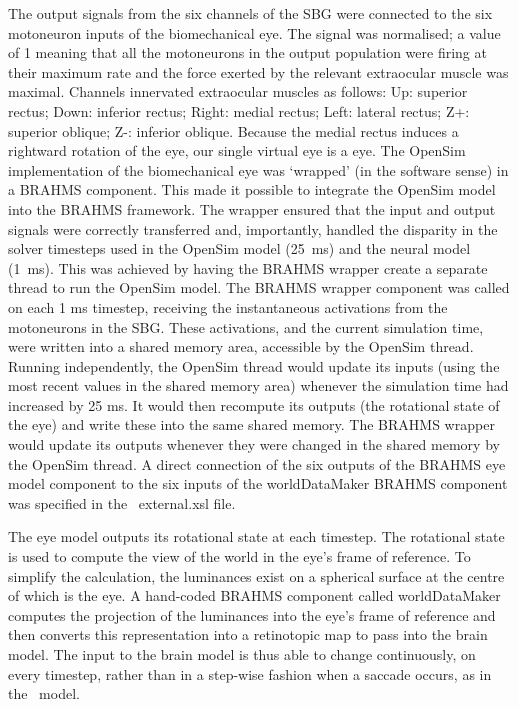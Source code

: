 \documentclass{frontiersSCNS}
\begin{document}
The output signals from the six channels of the SBG were connected to
the six motoneuron inputs of the biomechanical eye. The signal was
normalised; a value of 1 meaning that all the motoneurons in the
output population were firing at their maximum rate and the force
exerted by the relevant extraocular muscle was maximal. Channels
innervated extraocular muscles as follows: Up: superior rectus; Down:
inferior rectus; Right: medial rectus; Left: lateral rectus; Z+:
superior oblique; Z-: inferior oblique. Because the medial rectus
induces a rightward rotation of the eye, our single virtual eye is
a  eye. The OpenSim implementation of the biomechanical eye
was `wrapped' (in the software sense) in a BRAHMS component. This made
it possible to integrate the OpenSim model into the BRAHMS
framework. The wrapper ensured that the input and output signals were
correctly transferred and, importantly, handled the disparity in the
solver timesteps used in the OpenSim model (25~ms) and the neural
model (1~ms). This was achieved by having the BRAHMS wrapper create a
separate thread to run the OpenSim model. The BRAHMS wrapper component
was called on each 1 ms timestep, receiving the instantaneous
activations from the motoneurons in the SBG. These activations, and
the current simulation time, were written into a shared memory area,
accessible by the OpenSim thread. Running independently, the OpenSim
thread would update its inputs (using the most recent values in the
shared memory area) whenever the simulation time had increased by 25
ms. It would then recompute its outputs (the rotational state of the
eye) and write these into the same shared memory. The BRAHMS wrapper
would update its outputs whenever they were changed in the shared
memory by the OpenSim thread. A direct connection of the six outputs
of the BRAHMS eye model component to the six inputs of the
worldDataMaker BRAHMS component was specified in
the \stob~external.xsl file.

The eye model outputs its rotational state at each timestep. The
rotational state is used to compute the view of the world in the eye's
frame of reference. To simplify the calculation, the luminances exist
on a spherical surface at the centre of which is the eye. A hand-coded
BRAHMS component called worldDataMaker computes the projection of the
luminances into the eye's frame of reference and then converts this
representation into a retinotopic map to pass into the brain
model. The input to the brain model is thus able to change
continuously, on every timestep, rather than in a step-wise fashion
when a saccade occurs, as in the \ccg~model.
\end{document}
